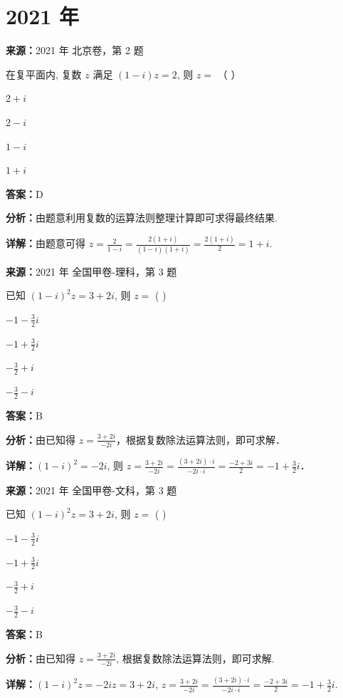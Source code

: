 \section*{2021 年}

\begin{question}[points=4]
\textbf{来源：}2021 年 北京卷，第 2 题\par
在复平面内, 复数 $z$ 满足 $(1-i)z=2$, 则 $z=$ （ ）
\begin{choices}
  \item $2+i$
  \item $2-i$
  \item $1-i$
  \item $1+i$
\end{choices}
\begin{solution}
\textbf{答案：}D

\textbf{分析：}由题意利用复数的运算法则整理计算即可求得最终结果.

\textbf{详解：}由题意可得 $z=\frac{2}{1-i}=\frac{2(1+i)}{(1-i)(1+i)}=\frac{2(1+i)}{2}=1+i$.
\end{solution}
\end{question}

\begin{question}[points=5]
\textbf{来源：}2021 年 全国甲卷-理科，第 3 题\par
已知 $(1-i)^2 z = 3 + 2i$, 则 $z =$ ( )
\begin{choices}
  \item $-1-\frac{3}{2}i$
  \item $-1+\frac{3}{2}i$
  \item $-\frac{3}{2}+i$
  \item $-\frac{3}{2}-i$
\end{choices}
\begin{solution}
\textbf{答案：}B

\textbf{分析：}由已知得 $z = \frac{3+2i}{-2i}$，根据复数除法运算法则，即可求解．

\textbf{详解：}$(1-i)^2 = -2i$, 则 $z = \frac{3+2i}{-2i} = \frac{(3+2i)\cdot i}{-2i\cdot i} = \frac{-2+3i}{2} = -1+\frac{3}{2}i$．
\end{solution}
\end{question}

\begin{question}[points=5]
\textbf{来源：}2021 年 全国甲卷-文科，第 3 题\par
已知 $(1-i)^2 z = 3+2i$, 则 $z =$ ( )
\begin{choices}
  \item $-1-\frac{3}{2}i$
  \item $-1+\frac{3}{2}i$
  \item $-\frac{3}{2}+i$
  \item $-\frac{3}{2}-i$
\end{choices}
\begin{solution}
\textbf{答案：}B

\textbf{分析：}由已知得 $z = \frac{3+2i}{-2i}$, 根据复数除法运算法则，即可求解.

\textbf{详解：}$(1-i)^2 z = -2i z = 3+2i$, $z = \frac{3+2i}{-2i} = \frac{(3+2i)\cdot i}{-2i \cdot i} = \frac{-2+3i}{2} = -1 + \frac{3}{2}i$.
\end{solution}
\end{question}


